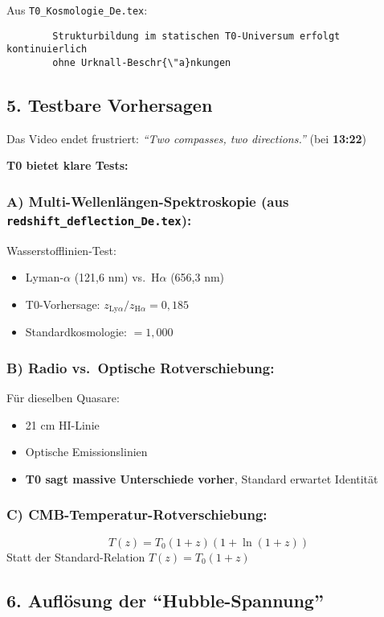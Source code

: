 \documentclass{article}
\begin{document}
	Aus \texttt{T0\_Kosmologie\_De.tex}:
	\begin{verbatim}
		Strukturbildung im statischen T0-Universum erfolgt kontinuierlich 
		ohne Urknall-Beschr{\"a}nkungen
	\end{verbatim}
	
	\subsection{5. Testbare Vorhersagen}
	
	Das Video endet frustriert: \textit{``Two compasses, two directions.''} (bei \textbf{13:22})
	
	\textbf{T0 bietet klare Tests:}
	
	\subsubsection{A) Multi-Wellenl{\"a}ngen-Spektroskopie (aus \texttt{redshift\_deflection\_De.tex}):}
	
	Wasserstofflinien-Test:
	\begin{itemize}
		\item Lyman-$\alpha$ (121,6 nm) vs.\ H$\alpha$ (656,3 nm)
		\item T0-Vorhersage: $z_{\mathrm{Ly}\alpha} / z_{\mathrm{H}\alpha} = 0{,}185$
		\item Standardkosmologie: $= 1{,}000$
	\end{itemize}
	
	\subsubsection{B) Radio vs.\ Optische Rotverschiebung:}
	F{\"u}r dieselben Quasare:
	\begin{itemize}
		\item 21 cm HI-Linie
		\item Optische Emissionslinien
		\item \textbf{T0 sagt massive Unterschiede vorher}, Standard erwartet Identit{\"a}t
	\end{itemize}
	
	\subsubsection{C) CMB-Temperatur-Rotverschiebung:}
	$$T(z) = T_0(1+z)(1+\ln(1+z))$$
	Statt der Standard-Relation $T(z) = T_0(1+z)$
	
	\subsection{6. Aufl{\"o}sung der ``Hubble-Spannung''}
	
\end{document}
